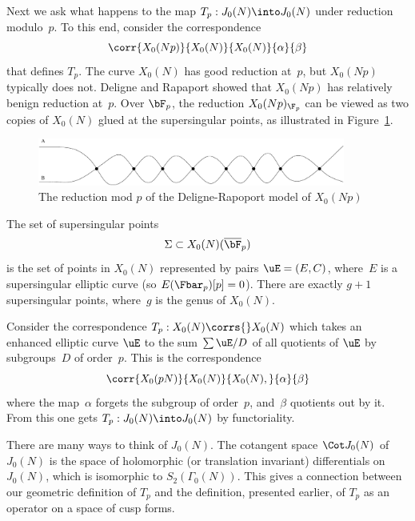 \documentclass{report}
\begin{document}
Next we ask what happens to the map $T_p:J_0(N)\into J_0(N)$
under reduction modulo~$p$.
To this end, consider the correspondence
\[
  \corr{X_0(Np)}{X_0(N)}{X_0(N)}{\alpha}{\beta}
\]
that defines $T_p$.  The curve $X_0(N)$ has good reduction at~$p$, but
$X_0(Np)$ typically does not.  Deligne and Rapaport
\cite{deligne-rapoport} showed that $X_0(Np)$ has relatively benign
reduction at~$p$. Over $\bF_p$, the reduction $X_0(Np)_{\F_p}$ can be
viewed as two copies of $X_0(N)$ glued at the supersingular points,
as illustrated in Figure~\ref{fig:deligne-rapoport}.
\begin{figure}
\includegraphics[width=0.9\textwidth]{graphics/deligne-rapaport}
\caption{The reduction mod $p$ of the Deligne-Rapoport
model of $X_0(Np)$%
\label{fig:deligne-rapoport}}
\end{figure}

The set of supersingular points
\[
  \Sigma\subset{}X_0(N)(\overline{\bF}_p)
\]
is the set of points in $X_0(N)$ represented by pairs $\uE=(E,C)$,
where~$E$ is a supersingular elliptic curve (so $E(\Fbar_p)[p]=0$).
There are exactly $g+1$ supersingular points, where~$g$ is the genus
of $X_0(N)$.


Consider the correspondence $T_p:X_0(N)\corrs{}X_0(N)$ which takes an
enhanced elliptic curve $\uE$ to the sum $\sum \uE/D$ of all quotients
of $\uE$ by subgroups~$D$ of order~$p$. This is the correspondence
\begin{equation}\label{eqn:tp_corr}
  \corr{X_0(pN)}{X_0(N)}{X_0(N),}{\alpha}{\beta}
\end{equation}
where  the map~$\alpha$ forgets the subgroup of order~$p$,
and~$\beta$ quotients out by it.
From this one gets $T_p:J_0(N)\into J_0(N)$ by
functoriality.

\begin{remark}
There are many ways to think of $J_0(N)$. The cotangent space $\Cot
J_0(N)$ of $J_0(N)$ is the space of holomorphic (or translation
invariant) differentials on $J_0(N)$, which is isomorphic to
$S_2(\Gamma_0(N))$. This gives a connection between our geometric
definition of $T_p$ and the definition, presented earlier, of $T_p$ as an operator on a space of cusp forms.
\end{remark}
\end{document}
